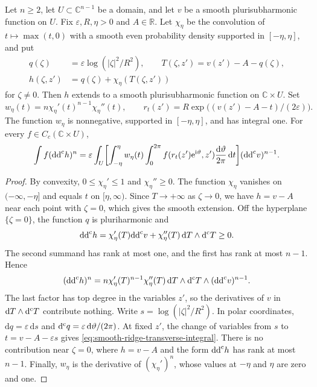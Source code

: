 \begin{lemma}\label{lem:smooth-logarithmic-ridge}
Let $n\geq2$, let $U\subset\mathbb C^{n-1}$ be a domain, and let $v$ be a smooth plurisubharmonic function on $U$. Fix $\varepsilon,R,\eta>0$ and $A\in\mathbb R$. Let $\chi_\eta$ be the convolution of $t\mapsto\max(t,0)$ with a smooth even probability density supported in $[-\eta,\eta]$, and put
\[
 \begin{split}
 q(\zeta)&=\varepsilon\log(|\zeta|^2/R^2),\qquad
 T(\zeta,z')=v(z')-A-q(\zeta),\\
 h(\zeta,z')&=q(\zeta)+\chi_\eta(T(\zeta,z'))
 \end{split}
\]
for $\zeta\ne0$. Then $h$ extends to a smooth plurisubharmonic function on $\mathbb C\times U$. Set
\[
 w_\eta(t)=n\chi_\eta'(t)^{n-1}\chi_\eta''(t),\qquad
 r_t(z')=R\exp\bigl((v(z')-A-t)/(2\varepsilon)\bigr).
\]
The function $w_\eta$ is nonnegative, supported in $[-\eta,\eta]$, and has integral one. For every $f\in C_c(\mathbb C\times U)$,
\begin{equation}\label{eq:smooth-ridge-transverse-integral}
 \begin{split}
 \int f(\mathrm{dd}^{\mathrm{c}} h)^n
 =\varepsilon\int_U\biggl[\int_{-\eta}^{\eta}w_\eta(t)
       \int_0^{2\pi}f(r_t(z')\mathrm e^{\mathrm i\vartheta},z')
                    \frac{\mathrm d\vartheta}{2\pi}\,\mathrm dt\biggr]
                    (\mathrm{dd}^{\mathrm{c}} v)^{n-1}.
 \end{split}
\end{equation}
\end{lemma}
\begin{proof}
By convexity, $0\leq\chi_\eta'\leq1$ and $\chi_\eta''\geq0$. The function $\chi_\eta$ vanishes on $(-\infty,-\eta]$ and equals $t$ on $[\eta,\infty)$. Since $T\to+\infty$ as $\zeta\to0$, we have $h=v-A$ near each point with $\zeta=0$, which gives the smooth extension. Off the hyperplane $\{\zeta=0\}$, the function $q$ is pluriharmonic and
\[
 \mathrm{dd}^{\mathrm{c}} h=\chi_\eta'(T)\mathrm{dd}^{\mathrm{c}} v
       +\chi_\eta''(T)\,\mathrm dT\wedge\mathrm d^{\mathrm c} T\geq0.
\]
The second summand has rank at most one, and the first has rank at most $n-1$. Hence
\[
 (\mathrm{dd}^{\mathrm{c}} h)^n=n\chi_\eta'(T)^{n-1}\chi_\eta''(T)
           \,\mathrm dT\wedge\mathrm d^{\mathrm c} T\wedge(\mathrm{dd}^{\mathrm{c}} v)^{n-1}.
\]
The last factor has top degree in the variables $z'$, so the derivatives of $v$ in $\mathrm dT\wedge\mathrm d^{\mathrm c} T$ contribute nothing. Write $s=\log(|\zeta|^2/R^2)$. In polar coordinates, $\mathrm dq=\varepsilon\,\mathrm ds$ and $\mathrm d^{\mathrm c} q=\varepsilon\,\mathrm d\vartheta/(2\pi)$. At fixed $z'$, the change of variables from $s$ to $t=v-A-\varepsilon s$ gives \eqref{eq:smooth-ridge-transverse-integral}. There is no contribution near $\zeta=0$, where $h=v-A$ and the form $\mathrm{dd}^{\mathrm{c}} h$ has rank at most $n-1$. Finally, $w_\eta$ is the derivative of $(\chi_\eta')^n$, whose values at $-\eta$ and $\eta$ are zero and one.
\end{proof}

